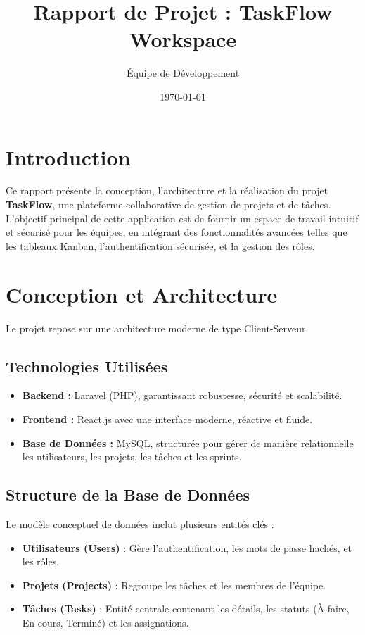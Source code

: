 \documentclass[12pt,a4paper]{article}
\title{\textbf{Rapport de Projet : TaskFlow Workspace}}
\author{Équipe de Développement}
\date{\today}
\begin{document}
\maketitle
\tableofcontents
\newpage

\section{Introduction}
Ce rapport présente la conception, l'architecture et la réalisation du projet \textbf{TaskFlow}, une plateforme collaborative de gestion de projets et de tâches. L'objectif principal de cette application est de fournir un espace de travail intuitif et sécurisé pour les équipes, en intégrant des fonctionnalités avancées telles que les tableaux Kanban, l'authentification sécurisée, et la gestion des rôles.

\section{Conception et Architecture}
Le projet repose sur une architecture moderne de type Client-Serveur. 

\subsection{Technologies Utilisées}
\begin{itemize}
    \item \textbf{Backend :} Laravel (PHP), garantissant robustesse, sécurité et scalabilité.
    \item \textbf{Frontend :} React.js avec une interface moderne, réactive et fluide.
    \item \textbf{Base de Données :} MySQL, structurée pour gérer de manière relationnelle les utilisateurs, les projets, les tâches et les sprints.
\end{itemize}

\subsection{Structure de la Base de Données}
Le modèle conceptuel de données inclut plusieurs entités clés :
\begin{itemize}
    \item \textbf{Utilisateurs (Users)} : Gère l'authentification, les mots de passe hachés, et les rôles.
    \item \textbf{Projets (Projects)} : Regroupe les tâches et les membres de l'équipe.
    \item \textbf{Tâches (Tasks)} : Entité centrale contenant les détails, les statuts (À faire, En cours, Terminé) et les assignations.
\end{itemize}
\end{document}
